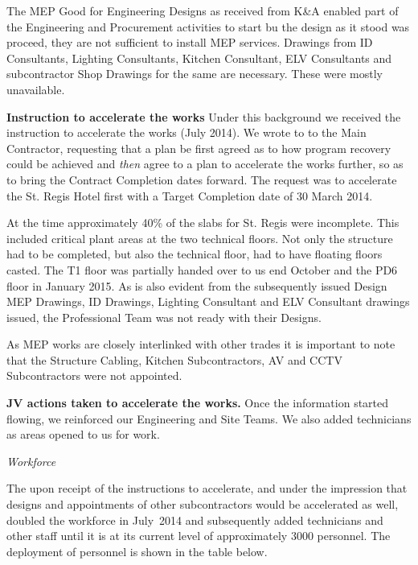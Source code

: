 The MEP Good for Engineering Designs as received from K\&A enabled part of the Engineering and Procurement activities to start bu the design as it stood was  proceed, they are not sufficient to install MEP services. Drawings from ID Consultants, Lighting Consultants, Kitchen Consultant, ELV Consultants and subcontractor Shop Drawings for the same are necessary. These were mostly unavailable.

\noindent\textbf{Instruction to accelerate the works}
Under this background we received the instruction to  accelerate the works (July 2014). We wrote to to the Main Contractor, requesting that a plan be first agreed as to how program recovery could be achieved and \emph{then} agree to a plan to accelerate the works further, so as to bring the Contract Completion dates forward. The request was to accelerate the St. Regis Hotel first with a Target Completion date of 30 March 2014.

At the time approximately 40\% of the slabs  for St. Regis were incomplete. This included critical plant areas at the two technical floors. Not only the structure had to be completed, but also the technical floor, had to have floating floors casted. The T1 floor was partially handed over to us end October and the PD6 floor in January 2015. As is also evident from the subsequently issued Design MEP Drawings, ID Drawings, Lighting Consultant and ELV Consultant drawings issued, the Professional Team was not ready with their Designs. 

As MEP works are closely interlinked with other trades it is important to note that the Structure Cabling, Kitchen Subcontractors, AV and CCTV Subcontractors were not appointed. 
\medskip

 
   


\label{acceleration}
\noindent\textbf{JV actions taken to accelerate the works.} Once the information started flowing, we reinforced our Engineering and Site Teams. We also added technicians as areas opened to us for work.
\medskip

\noindent\textit{Workforce}
\medskip

\noindent The \JV upon receipt of the instructions to accelerate, and under the impression that designs and appointments of other subcontractors would be accelerated as well, doubled the workforce in July~2014 and subsequently added technicians and other staff until it is at its current level of approximately 3000 personnel. The deployment of personnel is shown in the table below.

